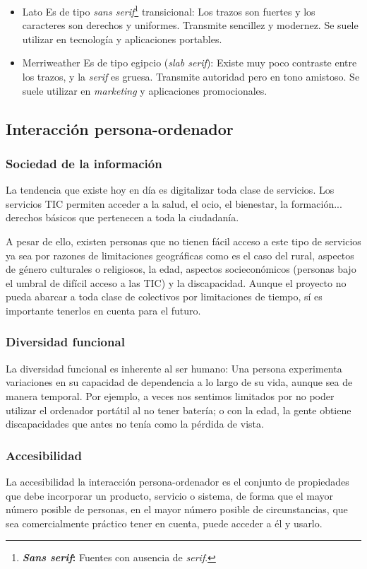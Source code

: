 \begin{itemize}
\item Lato
Es de tipo \textit{sans serif}\footnote{\textbf{\textit{Sans serif}:} Fuentes con ausencia de \textit{serif}.} transicional: Los trazos son fuertes y los caracteres son derechos y uniformes. Transmite sencillez y modernez. Se suele utilizar en tecnología y aplicaciones portables.
\item Merriweather
Es de tipo egipcio (\textit{slab serif}): Existe muy poco contraste entre los trazos, y la \textit{serif} es gruesa. Transmite autoridad pero en tono amistoso. Se suele utilizar en \textit{marketing} y aplicaciones promocionales.
\end{itemize}


\subsection{Interacción persona-ordenador}
\subsubsection{Sociedad de la información}
La tendencia que existe hoy en día es digitalizar toda clase de servicios. Los servicios TIC permiten acceder a la salud, el ocio, el bienestar, la formación... derechos básicos que pertenecen a toda la ciudadanía.


A pesar de ello, existen personas que no tienen fácil acceso a este tipo de servicios ya sea por razones de limitaciones geográficas como es el caso del rural, aspectos de género culturales o religiosos, la edad, aspectos socieconómicos (personas bajo el umbral de difícil acceso a las TIC) y la discapacidad.
Aunque el proyecto no pueda abarcar a toda clase de colectivos por limitaciones de tiempo, sí es importante tenerlos en cuenta para el futuro.


\subsubsection{Diversidad funcional} 
La diversidad funcional es inherente al ser humano: Una persona experimenta variaciones en su capacidad de dependencia a lo largo de su vida, aunque sea de manera temporal. Por ejemplo, a veces nos sentimos limitados por no poder utilizar el ordenador portátil al no tener batería; o con la edad, la gente obtiene discapacidades que antes no tenía como la pérdida de vista.


\subsubsection{Accesibilidad}
La accesibilidad la interacción persona-ordenador es el conjunto de propiedades que debe incorporar un producto, servicio o sistema, de forma que el mayor número posible de personas, en el mayor número posible de circunstancias, que sea comercialmente práctico tener en cuenta, puede acceder a él y usarlo.\cite{nordic_guidelines}



